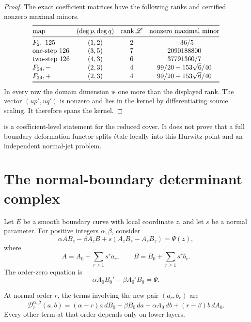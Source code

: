 \documentclass[11pt,reqno]{amsart}
\begin{document}
\begin{proof}
The exact coefficient matrices have the following ranks and certified
nonzero maximal minors.
\[
\begin{array}{@{}lccc@{}}
\toprule
\text{map} & (\deg p,\deg q) & \operatorname{rank}\mathscr L
& \text{nonzero maximal minor}\\
\midrule
F_2,\ 125 &(1,2)&2&-36/5\\
\text{one-step }126 &(3,5)&7&2090188800\\
\text{two-step }126 &(4,3)&6&37791360/7\\
F_{24},- &(2,3)&4&99/20-153\sqrt6/40\\
F_{24},+ &(2,3)&4&99/20+153\sqrt6/40\\
\bottomrule
\end{array}
\]
In every row the domain dimension is one more than the displayed rank.
The vector \((up',uq')\) is nonzero and lies in the kernel by
differentiating source scaling.  It therefore spans the kernel.
\end{proof}

\begin{remark}
 is a coefficient-level statement for the reduced
cover.  It does not prove that a full boundary deformation functor splits
étale-locally into this Hurwitz point and an independent normal-jet problem.
\end{remark}

\section{The normal-boundary determinant complex}
\label{sec:normal-complex}

Let \(E\) be a smooth boundary curve with local coordinate \(z\), and let
\(s\) be a normal parameter.  For positive integers \(\alpha,\beta\),
consider
\begin{equation}
\label{eq:master}
\alpha AB_z-\beta A_zB
+s(A_zB_s-A_sB_z)=\Psi(z),
\end{equation}
where
\[
A=A_0+\sum_{r\ge1}s^ra_r,\qquad
B=B_0+\sum_{r\ge1}s^rb_r.
\]
The order-zero equation is
\[
\alpha A_0B_0'-\beta A_0'B_0=\Psi.
\]

\begin{proposition}
\label{prop:layer}
At normal order \(r\), the terms involving the new pair
\((a_r,b_r)\) are
\begin{equation}
\label{eq:layer}
\boxed{
\mathscr D_r^{\alpha,\beta}(a,b)
=(\alpha-r)a\,dB_0-\beta B_0\,da
+\alpha A_0\,db+(r-\beta)b\,dA_0.}
\end{equation}
Every other term at that order depends only on lower layers.
\end{proposition}
\end{document}
